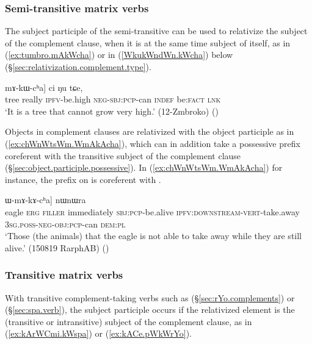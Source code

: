 \subsubsection{Semi-transitive matrix verbs} \label{sec:out.complement.relativization.cha}
The subject participle of the semi-transitive  can be used to relativize the subject of the complement clause, when it is at the same time subject of  itself, as in (\ref{ex:tumbro.mAkWcha}) or in (\ref{WkukWndWn.kWcha}) below (§\ref{sec:relativization.complement.type}).
 
\begin{exe}
\ex \label{ex:tumbro.mAkWcha}
\gll [\textbf{si} [wuma tu-mbro] mɤ-kɯ-cʰa] ci ŋu tɕe, \\
tree really \textsc{ipfv}-be.high \textsc{neg}-\textsc{sbj}:\textsc{pcp}-can \textsc{indef} be:\textsc{fact} \textsc{lnk} \\
\glt `It is a tree that cannot grow very high.' (12-Zmbroko)
()
\end{exe}


Objects in complement clauses are relativized with the object participle  as in (\ref{ex:chWnWtsWm.WmAkAcha}), which can in addition take a possessive prefix coreferent with the transitive subject of the complement clause (§\ref{sec:object.participle.possessive}). In (\ref{ex:chWnWtsWm.WmAkAcha}) for instance, the prefix  on  is coreferent with .

\begin{exe}
\ex \label{ex:chWnWtsWm.WmAkAcha}
\gll [[qaliaʁ kɯ, nɤkinɯ, nɯɕimɯma kɯ-sɯsu cʰɯ-nɯ-tsɯm] ɯ-mɤ-kɤ-cʰa] nɯnɯra \\
eagle \textsc{erg} \textsc{filler} immediately \textsc{sbj}:\textsc{pcp}-be.alive \textsc{ipfv}:\textsc{downstream}-\textsc{vert}-take.away \textsc{3sg}.\textsc{poss}-\textsc{neg}-\textsc{obj}:\textsc{pcp}-can \textsc{dem}:\textsc{pl} \\
\glt `Those (the animals) that the eagle is not able to take away while they are still alive.' (150819 RarphAB)
()
\end{exe}

\subsubsection{Transitive matrix verbs} \label{sec:out.complement.relativization.tr}
With transitive complement-taking verbs such as  (§\ref{sec:rYo.complements}) or  (§\ref{sec:spa.verb}), the subject participle occurs if the relativized element is the (transitive or intransitive) subject of the complement clause, as in (\ref{ex:kArWCmi.kWspa}) or (\ref{ex:kACe.pWkWrYo}).

